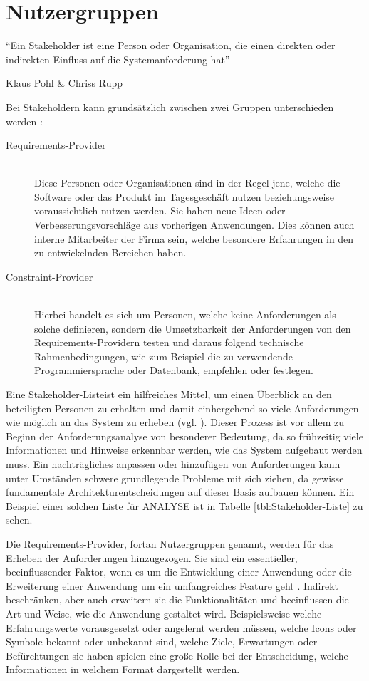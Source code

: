 \section{Nutzergruppen}
\label{sec:nutzergruppen}
\epigraph{"`Ein Stakeholder ist eine Person oder Organisation, die einen direkten oder indirekten Einfluss auf die Systemanforderung hat"'} {Klaus Pohl \& Chriss Rupp \cite[S.29]{Pohl.2011}}

Bei Stakeholdern kann grundsätzlich zwischen zwei Gruppen unterschieden werden \cite{Leffingwell.2011}:
\begin{description}
\item [Requirements-Provider] \hfill \\
Diese Personen oder Organisationen sind in der Regel jene, welche die Software oder das Produkt im Tagesgeschäft nutzen beziehungsweise voraussichtlich nutzen werden.
Sie haben neue Ideen oder Verbesserungsvorschläge aus vorherigen Anwendungen.
Dies können auch interne Mitarbeiter der Firma sein, welche besondere Erfahrungen in den zu entwickelnden Bereichen haben. %
\item [Constraint-Provider] \hfill \\
Hierbei handelt es sich um Personen, welche keine Anforderungen als solche definieren, sondern die Umsetzbarkeit der Anforderungen von den Requirements-Providern testen und daraus folgend technische Rahmenbedingungen, wie zum Beispiel die zu verwendende  Programmiersprache oder Datenbank, empfehlen oder festlegen.
\end{description}

Eine \glqq Stakeholder-Liste\grqq ist ein hilfreiches Mittel, um einen Überblick an den beteiligten Personen zu erhalten und damit einhergehend so viele Anforderungen wie möglich an das System zu erheben (vgl. \cite[S. 83]{Bergsmann.2018}).
Dieser Prozess ist vor allem zu Beginn der Anforderungsanalyse von besonderer Bedeutung, da so frühzeitig viele Informationen und Hinweise erkennbar werden, wie das System aufgebaut werden muss.
Ein nachträgliches anpassen oder hinzufügen von Anforderungen kann unter Umständen schwere grundlegende Probleme mit sich ziehen, da gewisse fundamentale Architekturentscheidungen auf dieser Basis aufbauen können.
Ein Beispiel einer solchen Liste für \gls{ANALYSE} ist in Tabelle \ref{tbl:Stakeholder-Liste} zu sehen.

Die Requirements-Provider, fortan Nutzergruppen genannt, werden für das Erheben der Anforderungen hinzugezogen.
Sie sind ein essentieller, beeinflussender Faktor, wenn es um die Entwicklung einer Anwendung oder die Erweiterung einer Anwendung um ein umfangreiches Feature geht \cite[S. 125]{Herczeg.2018}.
Indirekt beschränken, aber auch erweitern sie die Funktionalitäten und beeinflussen die Art und Weise, wie die Anwendung gestaltet wird. 
Beispielsweise welche Erfahrungswerte vorausgesetzt oder angelernt werden müssen, welche Icons oder Symbole bekannt oder unbekannt sind, welche Ziele, Erwartungen oder Befürchtungen sie haben spielen eine große Rolle bei der Entscheidung, welche Informationen in welchem Format dargestellt werden.

